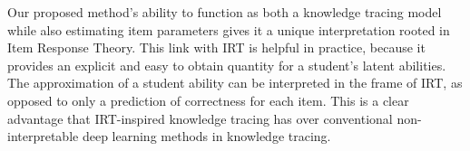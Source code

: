 Our proposed method's ability to function as both a knowledge tracing model while also estimating item parameters gives it a unique interpretation rooted in Item Response Theory. This link with IRT is helpful in practice, because it provides an explicit and easy to obtain quantity for a student's latent abilities. The approximation of a student ability can be interpreted in the frame of IRT, as opposed to only a prediction of correctness for each item. This is a clear advantage that IRT-inspired knowledge tracing has over conventional non-interpretable deep learning methods in knowledge tracing.

